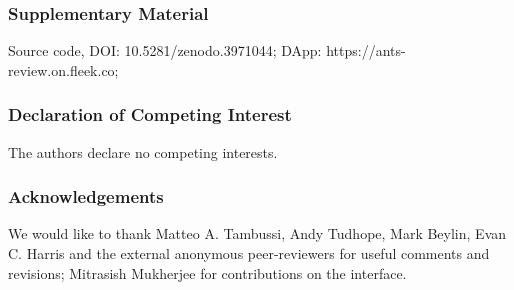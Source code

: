 \documentclass[runningheads]{llncs}
\begin{document}
\subsubsection{Supplementary Material}
Source code, DOI: 10.5281/zenodo.3971044; 
\newline DApp: https://ants-review.on.fleek.co;

\small{
\subsubsection{Declaration of Competing Interest}
The authors declare no competing interests.

\subsubsection{Acknowledgements} We would like to thank Matteo A. Tambussi, Andy Tudhope, Mark Beylin, Evan C. Harris and the external anonymous peer-reviewers for useful comments and revisions; Mitrasish Mukherjee for contributions on the interface.}


%
%


\end{document}
